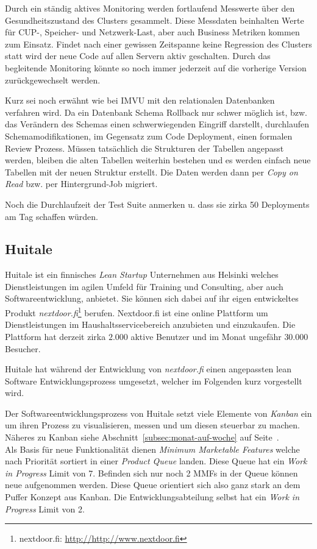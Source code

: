 Durch ein ständig aktives Monitoring werden fortlaufend Messwerte über den
Gesundheitszustand des Clusters gesammelt. Diese Messdaten beinhalten Werte
für CUP-, Speicher- und Netzwerk-Last, aber auch Business Metriken kommen zum
Einsatz. Findet nach einer gewissen Zeitspanne keine Regression des Clusters
statt wird der neue Code auf allen Servern aktiv geschalten. Durch das
begleitende Monitoring könnte so noch immer jederzeit auf die vorherige
Version zurückgewechselt werden.

Kurz sei noch erwähnt wie bei IMVU mit den relationalen Datenbanken verfahren
wird. Da ein Datenbank Schema Rollback nur schwer möglich ist, bzw. das
Verändern des Schemas einen schwerwiegenden Eingriff darstellt, durchlaufen
Schemamodifikationen, im Gegensatz zum Code Deployment, einen formalen Review
Prozess. Müssen tatsächlich die Strukturen der Tabellen angepasst werden,
bleiben die  alten Tabellen weiterhin bestehen und es werden einfach neue
Tabellen mit der neuen Struktur erstellt. Die Daten werden dann per \emph{Copy
on Read} bzw. per Hintergrund-Job migriert.

\begin{wichtigbox}
Noch die Durchlaufzeit der Test Suite anmerken u. dass sie zirka 50
Deployments am Tag schaffen würden.
\end{wichtigbox}


\subsection{Huitale}

Huitale ist ein finnisches \emph{Lean Startup} Unternehmen aus Helsinki
welches Dienstleistungen im agilen Umfeld für Training und Consulting, aber
auch Softwareentwicklung, anbietet. Sie können sich dabei auf ihr eigen
entwickeltes Produkt \emph{nextdoor.fi}\footnote{nextdoor.fi:
\url{http://http://www.nextdoor.fi}} berufen. Nextdoor.fi ist eine online
Plattform um Dienstleistungen im Haushaltsservicebereich anzubieten und
einzukaufen. Die Plattform hat derzeit zirka $2.000$ aktive Benutzer und im
Monat ungefähr $30.000$ Besucher.

Huitale hat während der Entwicklung von \emph{nextdoor.fi} einen angepassten
lean Software Entwicklungsprozess umgesetzt, welcher im Folgenden kurz
vorgestellt wird.

 Der Softwareentwicklungsprozess von Huitale setzt viele
Elemente von \emph{Kanban} ein um ihren Prozess zu visualisieren, messen und
um diesen steuerbar zu machen. Näheres zu Kanban siehe Abschnitt~\ref{subsec:monat-auf-woche}
auf Seite~\pageref{subsec:monat-auf-woche}. \\
Als Basis für neue Funktionalität dienen \emph{Minimum Marketable Features}
welche nach Priorität sortiert in einer \emph{Product Queue} landen. Diese
Queue hat ein \emph{Work in Progress} Limit von 7. Befinden sich nur noch 2
MMFs in der Queue können neue aufgenommen werden. Diese Queue orientiert sich
also ganz stark an dem Puffer Konzept aus Kanban. Die Entwicklungsabteilung
selbst hat ein \emph{Work in Progress} Limit von 2.

